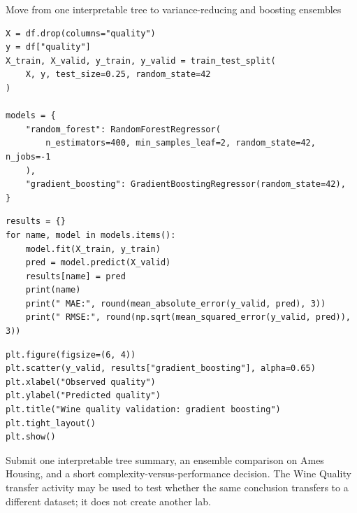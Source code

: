 \begin{labproject}{Move from one interpretable tree to variance-reducing and boosting ensembles}
\begin{lstlisting}[style=mlpython]
X = df.drop(columns="quality")
y = df["quality"]
X_train, X_valid, y_train, y_valid = train_test_split(
    X, y, test_size=0.25, random_state=42
)

models = {
    "random_forest": RandomForestRegressor(
        n_estimators=400, min_samples_leaf=2, random_state=42, n_jobs=-1
    ),
    "gradient_boosting": GradientBoostingRegressor(random_state=42),
}
\end{lstlisting}

\begin{lstlisting}[style=mlpython]
results = {}
for name, model in models.items():
    model.fit(X_train, y_train)
    pred = model.predict(X_valid)
    results[name] = pred
    print(name)
    print(" MAE:", round(mean_absolute_error(y_valid, pred), 3))
    print(" RMSE:", round(np.sqrt(mean_squared_error(y_valid, pred)), 3))
\end{lstlisting}

\begin{lstlisting}[style=mlpython]
plt.figure(figsize=(6, 4))
plt.scatter(y_valid, results["gradient_boosting"], alpha=0.65)
plt.xlabel("Observed quality")
plt.ylabel("Predicted quality")
plt.title("Wine quality validation: gradient boosting")
plt.tight_layout()
plt.show()
\end{lstlisting}

\end{labproject}

\begin{labdeliverable}
Submit one interpretable tree summary, an ensemble comparison on Ames Housing, and a short complexity-versus-performance decision. The Wine Quality transfer activity may be used to test whether the same conclusion transfers to a different dataset; it does not create another lab.
\end{labdeliverable}
